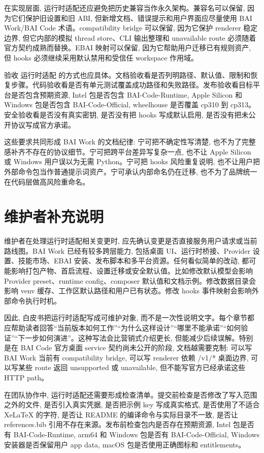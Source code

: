 在实现层面, 运行时适配还应避免把历史兼容当作永久架构。兼容名可以保留, 因为它们保护旧设置和旧 ABI, 但新增文档、错误提示和用户界面应尽量使用 BAI Work/BAI Code 术语。compatibility bridge 可以保留, 因为它保护 renderer 稳定边界, 但它内部的模拟 thread store、CLI 输出整理和 unavailable route 必须随着官方契约成熟而替换。EBAI 映射可以保留, 因为它帮助用户迁移已有规则资产, 但 hooks 必须继续采用默认禁用和受信任 workspace 作用域。

验收 运行时适配 的方式也应具体。文档验收看是否列明路径、默认值、限制和恢复步骤。代码验收看是否有单元测试覆盖成功路径和失败路径。发布验收看目标平台是否包含预期资源, Intel 包是否包含 BAI-Code-Runtime, Apple Silicon 和 Windows 包是否包含 BAI-Code-Official, wheelhouse 是否覆盖 cp310 到 cp313。安全验收看是否没有真实密钥, 是否没有把 hooks 写成默认启用, 是否没有把未公开协议写成官方承诺。

这些要求共同形成 BAI Work 的文档纪律: 宁可把不确定性写清楚, 也不为了完整感补齐不存在的协议细节。宁可把跨平台差异写复杂一点, 也不让 Apple Silicon 或 Windows 用户误以为无需 Python。宁可把 hooks 风险重复说明, 也不让用户把外部命令包当作普通提示词资产。宁可承认内部命名仍在迁移, 也不为了品牌统一在代码层做高风险重命名。

\section{维护者补充说明}

维护者在处理运行时适配相关变更时, 应先确认变更是否直接服务用户请求或当前路线图。BAI Work 已经有较多跨层能力, 包括桌面 UI、运行时桥接、Provider 设置、技能市场、EBAI 安装、发布脚本和多平台资源。任何看似简单的改动, 都可能影响打包产物、首启流程、设置迁移或安全默认值。比如修改默认模型会影响 Provider preset、runtime config、composer 默认值和文档示例。修改数据目录会影响 venv 缓存、工作区默认路径和用户已有状态。修改 hooks 事件映射会影响外部命令执行时机。

因此, 白皮书把运行时适配写成可维护对象, 而不是一次性说明文字。每个章节都应帮助读者回答“当前版本如何工作”“为什么这样设计”“哪里不能承诺”“如何验证”“下一步如何演进”。这种写法会比营销式介绍更长, 但能减少后续误解。特别是在 BAI Code 官方桌面 service 契约尚未公开的阶段, 文档越需要克制: 可以写 BAI Work 当前有 compatibility bridge, 可以写 renderer 依赖 /v1/* 桌面边界, 可以写某些 route 返回 unsupported 或 unavailable, 但不能写官方已经承诺这些 HTTP path。

在团队协作中, 运行时适配还需要形成检查清单。提交前检查是否修改了写入范围之外的文件, 是否引入真实凭据, 是否把示例 key 写成真实格式, 是否使用了不适合 XeLaTeX 的字符, 是否让 README 的编译命令与实际目录不一致, 是否让 references.bib 引用不存在来源。发布前检查包内是否存在预期资源, Intel 包是否有 BAI-Code-Runtime, arm64 和 Windows 包是否有 BAI-Code-Official, Windows 安装器是否保留用户 app data, macOS 包是否使用正确图标和 entitlements。

